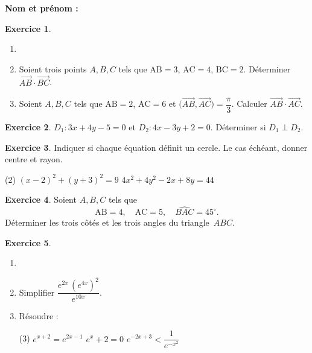 \documentclass{article}
\theoremstyle{definition}
\newtheorem{exercice}{Exercice}
\begin{document}
\pagestyle{fancy}

\fancyhf{} %
\fancyhead[L]{\large \textbf{\Niveau}}
\fancyhead[C]{\large \textbf{\Chapitre}}

\Large

\textbf{Nom et prénom :}\enspace\dotfill

\begin{exercice}
  \begin{enumerate}
    \item[]
    \item Soient trois points $A,B,C$ tels que $\mathrm{AB}=3$, $\mathrm{AC}=4$, $\mathrm{BC}=2$. Déterminer 
    $\overrightarrow{AB}\cdot\overrightarrow{BC}$.
    \item Soient $A,B,C$ tels que $\mathrm{AB}=2$, $\mathrm{AC}=6$ et 
    $\bigl(\overrightarrow{AB},\overrightarrow{AC}\bigr)=\dfrac{\pi}{3}$. 
    Calculer $\overrightarrow{AB}\cdot\overrightarrow{AC}$.
  \end{enumerate}
\end{exercice}

\vfill

\begin{exercice}
  $D_1:3x+4y-5=0$ et $D_2:4x-3y+2=0$.  
  Déterminer si $D_1\perp D_2$.
\end{exercice}

\vfill

\begin{exercice}
  Indiquer si chaque équation définit un cercle. Le cas échéant, donner centre et rayon.
  \begin{tasks}(2)
    \task $(x-2)^2+(y+3)^2=9$
    \task $4x^2+4y^2-2x+8y=44$
  \end{tasks}
\end{exercice}

\vfill

\begin{exercice}
  Soient $A,B,C$ tels que
  $$\mathrm{AB}=4,\quad\mathrm{AC}=5,\quad\widehat{BAC}=45^\circ.$$
  Déterminer les trois côtés et les trois angles du triangle~$ABC$.
\end{exercice}

\vfill

\begin{exercice}
  \begin{enumerate}
    \item[]
    \item Simplifier $\dfrac{e^{2x}\,(e^{4x})^2}{e^{10x}}$.
    \item Résoudre :
    \begin{tasks}(3)
      \task $e^{x+2}=e^{2x-1}$
      \task $e^x+2=0$
      \task $e^{-2x+3}<\dfrac1{e^{-x^2}}$
    \end{tasks}
  \end{enumerate}
\end{exercice}
\end{document}
